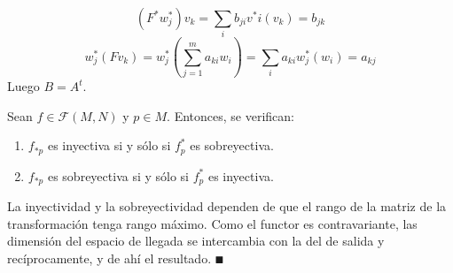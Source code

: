 \documentclass[cursovd_portada.tex]{subfiles}
\begin{document}
$$(F^*w^*_j)v_k=\sum_i b_{ji}v^*i(v_k)=b_{jk}$$
$$w^*_j(Fv_k)=w^*_j(\sum_{j=1}^ma_{ki}w_i)=\sum_i a_{ki}w^*_j(w_i)=a_{kj}$$
Luego $B=A^t$. 

\begin{prop}
Sean $f\in\mathcal{F}(M,N)$ y $p\in M$. Entonces, se verifican:
\begin{enumerate}
\item $f_{*p}$ es inyectiva si y sólo si $f_p^*$ es sobreyectiva.
\item $f_{*p}$ es sobreyectiva si y sólo si $f_p^*$ es inyectiva.
\end{enumerate}
\end{prop}

\begin{dem}
La inyectividad y la sobreyectividad dependen de que el rango de la matriz de la transformación tenga rango máximo. Como el functor es contravariante, las dimensión del espacio de llegada se intercambia con la del de salida y recíprocamente, y de ahí el resultado. $\QED$
\end{dem}
\newpage
\end{document}
